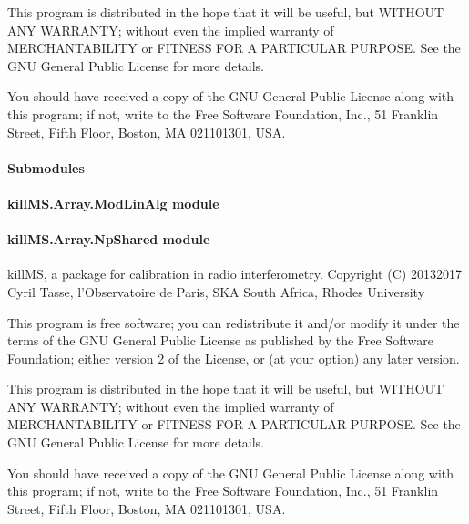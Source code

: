 \documentclass[letterpaper,10pt,english]{sphinxmanual}
\begin{document}
\sphinxAtStartPar
This program is distributed in the hope that it will be useful,
but WITHOUT ANY WARRANTY; without even the implied warranty of
MERCHANTABILITY or FITNESS FOR A PARTICULAR PURPOSE.  See the
GNU General Public License for more details.

\sphinxAtStartPar
You should have received a copy of the GNU General Public License
along with this program; if not, write to the Free Software
Foundation, Inc., 51 Franklin Street, Fifth Floor, Boston, MA  02110\sphinxhyphen{}1301, USA.


\paragraph{Submodules}
\label{\detokenize{api/killMS.Array:submodules}}

\paragraph{killMS.Array.ModLinAlg module}
\label{\detokenize{api/killMS.Array:killms-array-modlinalg-module}}

\paragraph{killMS.Array.NpShared module}
\label{\detokenize{api/killMS.Array:module-killMS.Array.NpShared}}\label{\detokenize{api/killMS.Array:killms-array-npshared-module}}
\sphinxAtStartPar
killMS, a package for calibration in radio interferometry.
Copyright (C) 2013\sphinxhyphen{}2017  Cyril Tasse, l’Observatoire de Paris,
SKA South Africa, Rhodes University

\sphinxAtStartPar
This program is free software; you can redistribute it and/or
modify it under the terms of the GNU General Public License
as published by the Free Software Foundation; either version 2
of the License, or (at your option) any later version.

\sphinxAtStartPar
This program is distributed in the hope that it will be useful,
but WITHOUT ANY WARRANTY; without even the implied warranty of
MERCHANTABILITY or FITNESS FOR A PARTICULAR PURPOSE.  See the
GNU General Public License for more details.

\sphinxAtStartPar
You should have received a copy of the GNU General Public License
along with this program; if not, write to the Free Software
Foundation, Inc., 51 Franklin Street, Fifth Floor, Boston, MA  02110\sphinxhyphen{}1301, USA.
\end{document}
